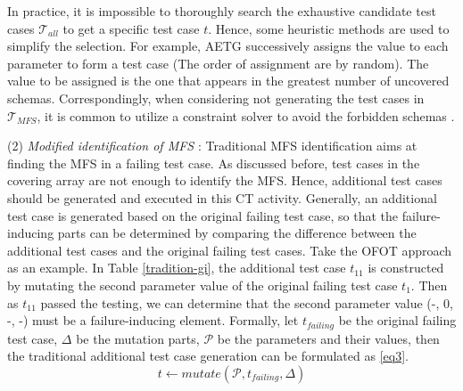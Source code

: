 \documentclass{sig-alternate}
\begin{document}
In practice, it is impossible to thoroughly search the exhaustive candidate test cases $\mathcal{T}_{all}$ to get a specific test case $t$. Hence, some heuristic methods are used to simplify the selection. For example, AETG \cite{cohen1997aetg} successively assigns the value to each parameter to form a test case (The order of assignment are by random). The value to be assigned is the one that appears in the greatest number of uncovered schemas. Correspondingly, when considering not generating the test cases in $\mathcal{T}_{MFS}$, it is common to utilize a constraint solver to avoid the forbidden schemas \cite{cohen2007interaction,cohen2008constructing}.



%
%






(2) \emph{Modified identification of MFS} : Traditional MFS identification aims at finding the MFS in a failing test case. As discussed before, test cases in the covering array are not enough to identify the MFS. Hence, additional test cases should be generated and executed in this CT activity. Generally, an additional test case is generated based on the original failing test case, so that the failure-inducing parts can be determined by comparing the difference between the additional test cases and the original failing test cases. Take the OFOT approach as an example. In Table \ref{tradition-gi}, the additional test case $t_{11}$ is constructed by mutating the second parameter value of the original failing test case $t_{1}$. Then as $t_{11}$ passed the testing, we can determine that the second parameter value (-, 0, -, -) must be a failure-inducing element. Formally, let $t_{failing}$ be the original failing test case, $\Delta$ be the mutation parts, $\mathcal{P}$ be the parameters and their values, then the traditional additional test case generation can be formulated as \ref{eq3}.
\begin{displaymath}t \leftarrow  mutate (\mathcal{P}, t_{failing}, \Delta )  \tag{EQ3} \label{eq3} \end{displaymath}
\end{document}
